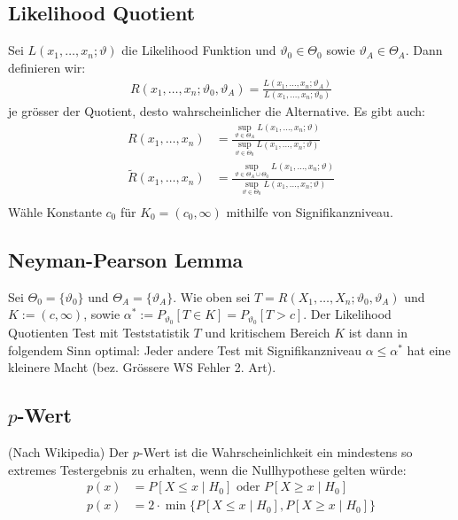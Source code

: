 \documentclass[8pt]{extarticle}
\newcommand{\vt}{\vartheta}
\newcommand{\cond}[2]{P[#1 \; | \; #2]}
\newcommand{\zufallsvariablen}{X_1, \dots, X_n}
\begin{document}
\begin{multicols*}{3}
  \subsection*{Likelihood Quotient}
  Sei $L (x_1, \dots, x_n; \vt)$ die Likelihood Funktion und $\vt_0 \in
    \varTheta_0$ sowie $\vt_A \in \varTheta_A$. Dann definieren wir:
  \begin{align*}
    R (x_1, \dots, x_n; \vt_0, \vt_A) = \frac{L (x_1, \dots, x_n; \vt_A)}{L (x_1, \dots, x_n; \vt_0)}
  \end{align*}
  je grösser der Quotient, desto wahrscheinlicher die Alternative. Es gibt auch:
  \begin{align*}
    R (x_1, \dots, x_n)             & = \frac{ \sup_{\vt \in \varTheta_A} L (x_1, \dots, x_n; \vt)}{\sup_{\vt \in \varTheta_0} L (x_1, \dots, x_n; \vt)}                  \\
    \widetilde{R} (x_1, \dots, x_n) & = \frac{ \sup_{\vt \in \varTheta_A \cup \varTheta_0} L (x_1, \dots, x_n; \vt)}{\sup_{\vt \in \varTheta_0} L (x_1, \dots, x_n; \vt)} \\
  \end{align*}
  Wähle Konstante $c_0$ für $K_0 =  (c_0, \infty)$ mithilfe von Signifikanzniveau.
  \subsection*{Neyman-Pearson Lemma}
  Sei $\varTheta_0 = \{\vt_0\}$ und $\varTheta_A = \{\vt_A\}$. Wie oben sei $T =
    R (\zufallsvariablen; \vt_0, \vt_A)$ und $K :=  (c, \infty)$, sowie $\alpha^* :=
    P_{\vt_0}[T \in K] = P_{\vt_0}[T > c]$. Der Likelihood Quotienten Test mit
  Teststatistik $T$ und kritischem Bereich $K$ ist dann in folgendem Sinn
  optimal: Jeder andere Test mit Signifikanzniveau $\alpha \leq \alpha^*$ hat
  eine kleinere Macht  (bez. Grössere WS Fehler 2. Art).
  \subsection*{$p$-Wert}
   (Nach Wikipedia) Der $p$-Wert ist die Wahrscheinlichkeit ein mindestens
  so extremes Testergebnis zu erhalten, wenn die Nullhypothese gelten würde:
  \begin{align*}
    p (x) & = \cond{X \leq x}{H_0} \text{   oder   } \cond{X \geq x}{H_0}   \\
    p (x) & = 2 \cdot \min \{ \cond{X \leq x}{H_0}, \cond{X \geq x}{H_0} \}
  \end{align*}

\end{multicols*}
\end{document}

